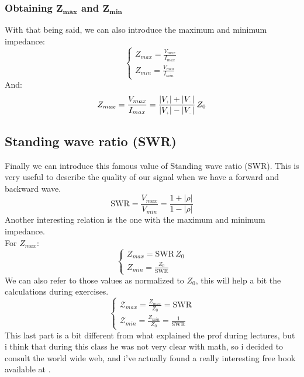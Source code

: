 \subsubsection*{Obtaining $\bm{Z_{max}}$ and $\bm{Z_{min}}$}
With that being said, we can also introduce the maximum and minimum\\
impedance:
\begin{equation}
    \begin{cases}
        Z_{max} = \frac{V_{max}}{I_{max}}\\
        Z_{min} = \frac{V_{min}}{I_{min}}
    \end{cases}
\end{equation}
And:
\begin{equation}
    Z_{max}=\frac{V_{max}}{I_{max}}=\frac{|V\bottomPlus|+|V\bottomMinus|}{|V\bottomPlus|-|V\bottomMinus|}\,Z_0
\end{equation}
\subsection*{Standing wave ratio (SWR)}
Finally we can introduce this famous value of Standing wave ratio (SWR). This is very useful to describe the quality of our signal when we have a forward and backward wave.
\begin{equation}\label{eq:swr_def}
    \text{SWR}=\frac{V_{max}}{V_{min}}=\frac{1+|\rho|}{1-|\rho|}
\end{equation}
Another interesting relation is the one with the maximum and minimum\\
impedance.\\
For $Z_{max}$:
\begin{equation}
    \begin{cases}
        Z_{max} = \text{SWR}\,Z_0 \\
        Z_{min} = \frac{Z_0}{\text{SWR}}
    \end{cases}
\end{equation}
We can also refer to those values as normalized to $Z_0$, this will help a bit the calculations during exercises.
\begin{equation}
    \begin{cases}\label{eq:normalized_impedance}
        \mathcal{Z}_{max} = \frac{Z_{max}}{Z_0}=\text{SWR}\\
        \mathcal{Z}_{min} = \frac{Z_{min}}{Z_0}=\frac{1}{\text{SWR}}
    \end{cases}
\end{equation}
This last part is a bit different from what explained the prof during lectures, but i think that during this class he was not very clear with math, so i decided to consult the world wide web, and i've actually found a really interesting free book available at \cite{Ellingson2020Book}.

